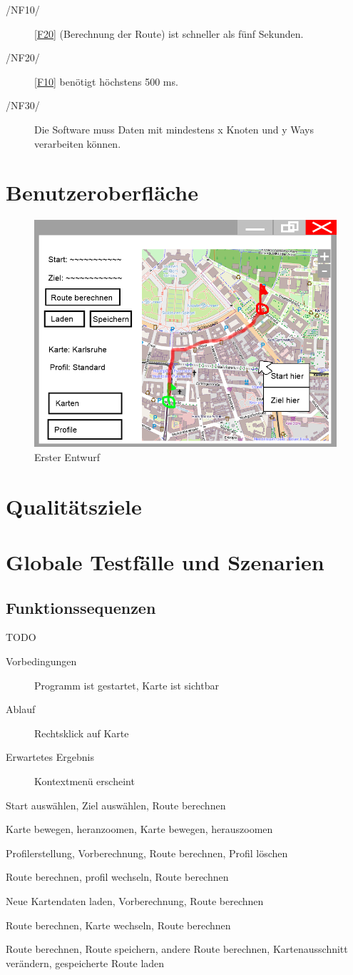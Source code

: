 \documentclass[a4paper, 11pt]{article}
\makeatletter
\def\namedlabel#1#2{\begingroup
    #2%
    \def\@currentlabel{#2}%
    \phantomsection\label{#1}\endgroup
}
\newcommand{\oitem}[1]{\item[\namedlabel{#1}{/#1/}]}
\newcommand{\testfall}[3]{
  \begin{description}
    \item[Vorbedingungen] #1
    \item[Ablauf] #2
    \item[Erwartetes Ergebnis] #3
  \end{description}
}
\makeatother
\begin{document}
\begin{description}
\oitem{NF10} \ref{F20} (Berechnung der Route) ist schneller als fünf Sekunden.
\oitem{NF20} \ref{F10} benötigt höchstens 500 ms.
\oitem{NF30} Die Software muss Daten mit mindestens x Knoten und y Ways verarbeiten können.
\end{description}
\section{Benutzeroberfläche}
\begin{figure}
\centering
\includegraphics[width=0.7\linewidth]{mockup_screenshot}
\caption{Erster Entwurf}
\label{fig:mockupscreenshot}
\end{figure}
\section{Qualitätsziele}
\section{Globale Testfälle und Szenarien}
\subsection{Funktionssequenzen}
\begin{description}
TODO
\item\testfall
    {Programm ist gestartet, Karte ist sichtbar}
    {Rechtsklick auf Karte}
    {Kontextmenü erscheint}
\oitem{TF10}
Start auswählen, Ziel auswählen, Route berechnen
\oitem{TF20}
Karte bewegen, heranzoomen, Karte bewegen, herauszoomen
\oitem{TF30}
Profilerstellung, Vorberechnung, Route berechnen, Profil löschen
\oitem{TF40}
Route berechnen, \gls{profil} wechseln, Route berechnen
\oitem{TF50}
Neue Kartendaten laden, Vorberechnung, Route berechnen
\oitem{TF60}
Route berechnen, Karte wechseln, Route berechnen
\oitem{TF70}
Route berechnen, Route speichern, andere Route berechnen, Kartenausschnitt verändern, gespeicherte Route laden
\end{description}
\end{document}
